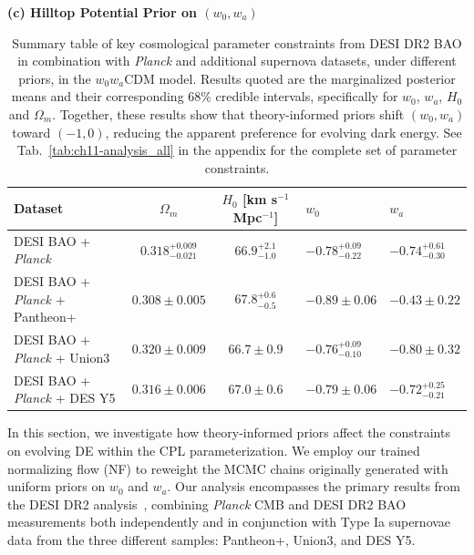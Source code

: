 \begin{table}[!t]
	\textbf{(c) Hilltop Potential Prior on $(w_0,w_a)$}\\[6pt]
		\begingroup
		\renewcommand{\arraystretch}{1}
		\begin{tabularx}{\textwidth}{@{}>{\raggedright\arraybackslash}p{3.5cm} c c W W @{}}
			\toprule
			Dataset & $\Omega_m$ & $H_0$ [km s$^{-1}$ Mpc$^{-1}$] & $w_0$ & $w_a$ \\
			\midrule[0.065em]
			DESI BAO + {\it Planck}  & $0.318^{+0.009}_{-0.021}$ & $66.9^{+2.1}_{-1.0}$ & $-0.78^{+0.09}_{-0.22}$ & $-0.74^{+0.61}_{-0.30}$ \\
			DESI BAO + {\it Planck}  + Pantheon+ & $0.308\pm 0.005$ & $67.8^{+0.6}_{-0.5}$ & $-0.89\pm 0.06$ & $-0.43\pm 0.22$\\
			DESI BAO + {\it Planck}  + Union3 & $0.320\pm 0.009$ & $66.7\pm 0.9$ & $-0.76^{+0.09}_{-0.10}$ & $-0.80\pm 0.32$ \\
			DESI BAO + {\it Planck}  + DES Y5 & $0.316\pm 0.006$ & $67.0\pm 0.6$ & $-0.79\pm 0.06$ & $-0.72^{+0.25}_{-0.21}$\\
			\bottomrule
		\end{tabularx}
		\endgroup
	\caption[Constraints under uniform and theory priors]{Summary table of key cosmological parameter constraints from DESI DR2 BAO in combination with {\it Planck} and additional supernova datasets, under different priors, in the $w_0 w_a$CDM model. Results quoted are the marginalized posterior means and their corresponding 68\% credible intervals, specifically for $w_0$, $w_a$, $H_0$ and $\Omega_m$. Together, these results show that theory-informed priors shift $(w_0,w_a)$ toward $(-1,0)$, reducing the apparent preference for evolving dark energy. See Tab.~\ref{tab:ch11-analysis_all} in the appendix for the complete set of parameter constraints.}
	\label{tab:ch11-table_post}
\end{table}

\noindent In this section, we investigate how theory-informed priors affect the constraints on evolving DE within the CPL parameterization. We employ our trained normalizing flow (NF) to reweight the MCMC chains originally generated with uniform priors on $w_0$ and $w_a$. Our analysis encompasses the primary results from the DESI DR2 analysis~\cite{DESI:2025zgx, DESI:2025fii}, combining \textit{Planck} CMB and DESI DR2 BAO measurements both independently and in conjunction with Type Ia supernovae data from the three different samples: Pantheon+, Union3, and DES Y5.


